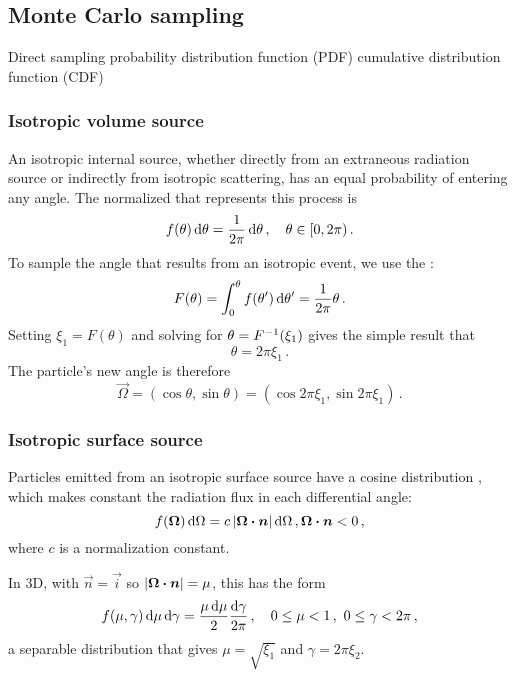 \subsection{Monte Carlo sampling}
\cite{Lew1984,Bro2004a}
Direct sampling 
probability distribution function (PDF)
cumulative distribution function (CDF)

\subsubsection{Isotropic volume source}
An isotropic internal source, whether directly from an extraneous radiation
source or indirectly from isotropic scattering, has an equal probability of
entering any angle. The normalized  that
represents this process is
\begin{equation*}
  f(\theta) \mathop{}\!\mathrm{d} \theta = \frac{1}{2\pi} \mathop{}\!\mathrm{d} \theta\,, \quad \theta \in [0, 2\pi)\,.
\end{equation*}
To sample the angle that results from an isotropic event, we use the :
\begin{equation*}
  F(\theta) = \int_{0}^{\theta} f(\theta') \mathop{}\!\mathrm{d} \theta' = \frac{1}{2\pi}
  \theta\,.
\end{equation*}
Setting $\xi_1 = F(\theta)$ and solving for $\theta = F^{-1}(\xi_1)$ gives the
simple result that
\begin{equation*}
  \theta = 2\pi \xi_1\,.
\end{equation*}
The particle's new angle is therefore
\begin{equation*}
  \vec{\Omega} = ( \cos \theta, \sin \theta) = ( \cos 2\pi\xi_1, \sin
  2\pi\xi_1)\,.
\end{equation*}

\subsubsection{Isotropic surface source}
Particles emitted from an isotropic surface source have a cosine distribution
\cite{Gre2002}, which makes constant the radiation flux in each differential
angle:
\begin{equation}\label{eq:surfaceSource}
  f(\bm{\Omega}) \mathop{}\!\mathrm{d} \Omega = c \left| \bm{\Omega}\bm{\cdot} \bm{n} \right| \mathop{}\!\mathrm{d} \Omega \,,
\bm{\Omega}\bm{\cdot} \bm{n} < 0 \,,
\end{equation}
where $c$ is a normalization constant.

In 3D, with $\vec{n}=\vec{i}$ so $\left| \bm{\Omega}\bm{\cdot} \bm{n} \right|=\mu$, this has
the form
\begin{equation*}
  f(\mu, \gamma) \mathop{}\!\mathrm{d}\mu \mathop{}\!\mathrm{d}\gamma = \frac{\mu \mathop{}\!\mathrm{d}\mu}{2} \frac{\mathop{}\!\mathrm{d}\gamma}{2\pi}
  \,,\quad 0 \le \mu < 1\,,\ 0 \le \gamma < 2\pi\,,
\end{equation*}
a separable distribution that gives $\mu=\sqrt{\xi_1}$ and $\gamma=2\pi \xi_2$.


